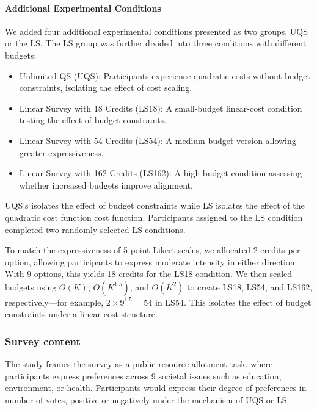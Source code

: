 \paragraph{Additional Experimental Conditions}
We added four additional experimental conditions presented as two groups, UQS or the LS. The LS group was further divided into three conditions with different budgets:

\begin{itemize}
    \item Unlimited QS (UQS): Participants experience quadratic costs without budget constraints, isolating the effect of cost scaling.
    \item Linear Survey with 18 Credits (LS18): A small-budget linear-cost condition testing the effect of budget constraints.
    \item Linear Survey with 54 Credits (LS54): A medium-budget version allowing greater expressiveness.
    \item Linear Survey with 162 Credits (LS162): A high-budget condition assessing whether increased budgets improve alignment.
\end{itemize}

UQS's isolates the effect of budget constraints while LS isolates the effect of the quadratic cost function cost function. Participants assigned to the LS condition completed two randomly selected LS conditions.

To match the expressiveness of 5-point Likert scales, we allocated 2 credits per option, allowing participants to express moderate intensity in either direction. With 9 options, this yields 18 credits for the LS18 condition. We then scaled budgets using $O(K)$, $O(K^{1.5})$, and $O(K^2)$ to create LS18, LS54, and LS162, respectively—for example, $2 \times 9^{1.5}=54$ in LS54. This isolates the effect of budget constraints under a linear cost structure.




\subsubsection{Survey content}
The study frames the survey as a public resource allotment task, where participants express preferences across 9 societal issues such as education, environment, or health. Participants would express their degree of preferences in number of votes, positive or negatively under the mechanism of UQS or LS.

